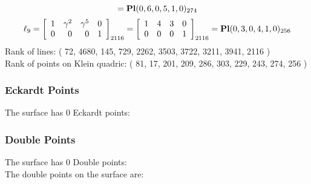 \documentclass{article}
\begin{document}
{$$={\rm\bf Pl}(0,6,0,5,1,0 )_{274}$$
$$
\ell_{9} = 
\left[
\begin{array}{*{4}{r}}
1 & \gamma^{2} & \gamma^{5} & 0\\
0 & 0 & 0 & 1\\
\end{array}
\right]
_{2116}
=
\left[
\begin{array}{*{4}c}
1  & 4  & 3  & 0\\
0  & 0  & 0  & 1\\
\end{array}
\right]_{2116}
={\rm\bf Pl}(0,3,0,4,1,0 )_{256}$$
Rank of lines: ( 72, 4680, 145, 729, 2262, 3503, 3722, 3211, 3941, 2116 )\\
Rank of points on Klein quadric: ( 81, 17, 201, 209, 286, 303, 229, 243, 274, 256 )\\
\subsubsection*{Eckardt Points}
The surface has 0 Eckardt points:\\
\subsubsection*{Double Points}
The surface has 0 Double points:\\
The double points on the surface are:\\
\begin{multicols}{2}
\noindent
\end{multicols}
}
\end{document}
